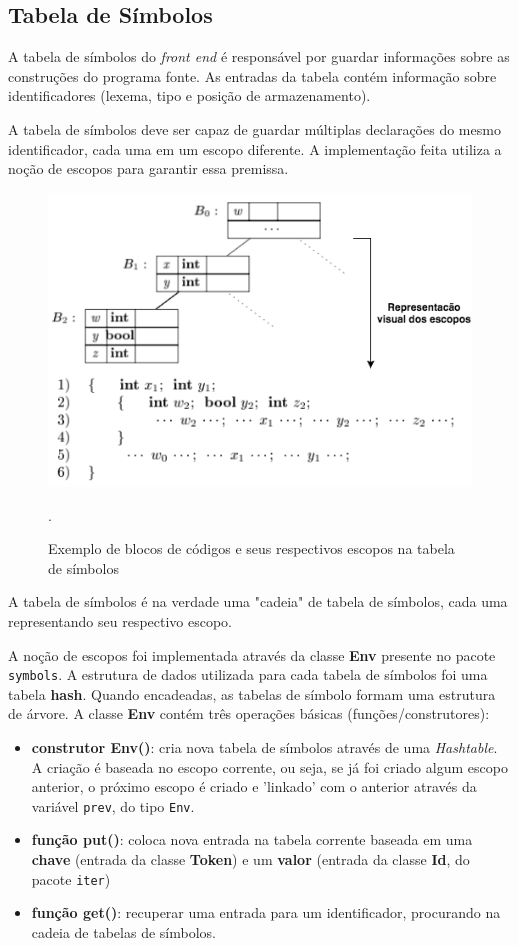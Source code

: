 \subsection{Tabela de Símbolos}
A tabela de símbolos do \textit{front end} é responsável por guardar informações sobre as construções do programa fonte. As entradas da tabela contém informação sobre identificadores (lexema, tipo e posição de armazenamento). 

A tabela de símbolos deve ser capaz de guardar múltiplas declarações do mesmo identificador, cada uma em um escopo diferente. A implementação feita utiliza a noção de escopos para garantir essa premissa.

\begin{figure}[H]
	\includegraphics[width=1\textwidth]{imgs/st_scopes.png}
	\caption{Exemplo de blocos de códigos e seus respectivos escopos na tabela de símbolos}.
	\label{fig:dccnet}
\end{figure}

A tabela de símbolos é na verdade uma "cadeia" de tabela de símbolos, cada uma representando seu respectivo escopo. 

A noção de escopos foi implementada através da classe \textbf{Env} presente no pacote \texttt{symbols}. A estrutura de dados utilizada para cada tabela de símbolos foi uma tabela \textbf{hash}. Quando encadeadas, as tabelas de símbolo formam uma estrutura de árvore. A classe \textbf{Env} contém três operações básicas (funções/construtores):

\begin{itemize}
\item \textbf{construtor Env()}: cria nova tabela de símbolos através de uma \textit{Hashtable}. A criação é baseada no escopo corrente, ou seja, se já foi criado algum escopo anterior, o próximo escopo é criado e 'linkado' com o anterior através da variável \texttt{prev}, do tipo \texttt{Env}.
\item \textbf{função put()}: coloca nova entrada na tabela corrente baseada em uma \textbf{chave} (entrada da classe \textbf{Token}) e um \textbf{valor} (entrada da classe \textbf{Id}, do pacote \texttt{iter})
\item \textbf{função get()}: recuperar uma entrada para um identificador, procurando na cadeia de tabelas de símbolos.
\end{itemize}

